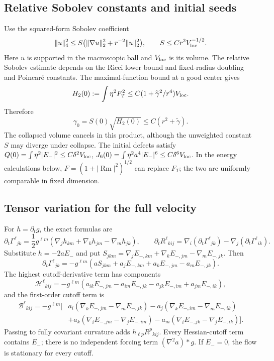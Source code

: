 \documentclass[a4paper,11pt]{article}
\numberwithin{equation}{section}
\theoremstyle{definition}
\newcommand{\Rm}{\operatorname{Rm}}
\begin{document}
\subsection{Relative Sobolev constants and initial seeds}
Use the squared-form Sobolev coefficient
\begin{equation}\label{eq:relative-sob}
\|u\|_4^2\le S\bigl(\|\nabla u\|_2^2+r^{-2}\|u\|_2^2\bigr),
\qquad S\le Cr^2V_{\rm loc}^{-1/2}.
\end{equation}
Here $u$ is supported in the macroscopic ball and $V_{\rm loc}$ is its volume. The relative Sobolev estimate depends on the Ricci lower bound and fixed-radius doubling and Poincar\'e constants. The maximal-function bound at a good center gives
\[
H_2(0):=\int\eta^2F_T^2\le
C(1+\widetilde\gamma^2/r^4)V_{\rm loc}.
\]
Therefore
\begin{equation}\label{eq:smallgamma}
\gamma_0=S(0)\sqrt{H_2(0)}
\le C(r^2+\widetilde\gamma).
\end{equation}
The collapsed volume cancels in this product, although the unweighted constant $S$ may diverge under collapse. The initial defects satisfy
$Q(0)=\int\eta^2|E_-|^2\le C\delta^2V_{\rm loc}$,
$J_6(0)=\int\eta^2a^4|E_-|^6\le C\delta^6V_{\rm loc}$.
In the energy calculations below, $F=(1+|\Rm|^2)^{1/2}$ can replace $F_T$; the two are uniformly comparable in fixed dimension.

\subsection{Tensor variation for the full velocity}
For $h=\partial_tg$, the exact formulas are
\[
\partial_t\Gamma^\ell{}_{jk}
=\frac12g^{\ell m}(\nabla_jh_{km}+\nabla_kh_{jm}-\nabla_mh_{jk}),
\qquad
\partial_tR^\ell{}_{kij}
=\nabla_i(\partial_t\Gamma^\ell{}_{jk})
-\nabla_j(\partial_t\Gamma^\ell{}_{ik}).
\]
Substitute $h=-2aE_-$ and put $S_{jkm}=\nabla_jE_{-,km}+\nabla_kE_{-,jm}-\nabla_mE_{-,jk}$. Then
\[
\partial_t\Gamma^\ell{}_{jk}
=-g^{\ell m}(aS_{jkm}+a_jE_{-,km}+a_kE_{-,jm}-a_mE_{-,jk}).
\]
The highest cutoff-derivative term has components
\[
\mathcal H^\ell{}_{kij}
=-g^{\ell m}(a_{ik}E_{-,jm}-a_{im}E_{-,jk}
-a_{jk}E_{-,im}+a_{jm}E_{-,ik}),
\]
and the first-order cutoff term is
\begin{align*}
\mathcal B^\ell{}_{kij}=-g^{\ell m}\bigl[
&a_i(\nabla_kE_{-,jm}-\nabla_mE_{-,jk})
-a_j(\nabla_kE_{-,im}-\nabla_mE_{-,ik})\\
&+a_k(\nabla_iE_{-,jm}-\nabla_jE_{-,im})
-a_m(\nabla_iE_{-,jk}-\nabla_jE_{-,ik})\bigr].
\end{align*}
Passing to fully covariant curvature adds $h_{\ell p}R^p{}_{kij}$. Every Hessian-cutoff term contains $E_-$; there is no independent forcing term $(\nabla^2a)*g$. If $E_-=0$, the flow is stationary for every cutoff.
\end{document}
